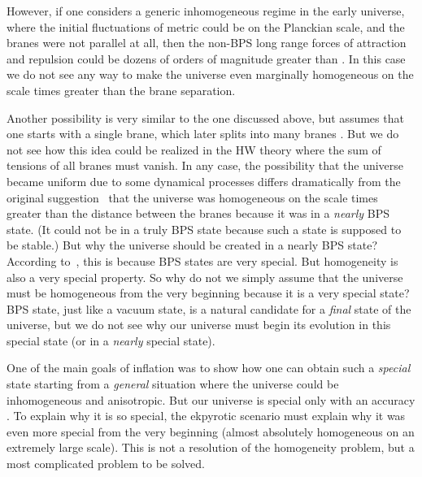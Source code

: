 \documentclass[a4paper,12pt]{article}
\begin{document}
However,  if one considers a generic inhomogeneous regime in the early
universe, where the initial fluctuations of metric could be \coordHE{} on the
Planckian scale, and the branes were not parallel at all, then  the
non-BPS long range forces of attraction and repulsion could be dozens of
orders of magnitude greater than  \coordHE{}. In this case we do
not see any way to make the universe even marginally homogeneous on the
scale \coordHE{} times greater than the brane separation.

Another possibility is very similar to the one discussed above, but assumes that one starts with a single brane, which later splits into many branes \cite{Khoury:2001iy}. But we do not see how this idea could be realized in the HW theory where the sum of tensions of all branes must vanish. In any case, the possibility that the universe became uniform due to some dynamical processes differs dramatically from the original suggestion~\cite{KOST}  that the universe was homogeneous on the scale \coordHE{} times greater than the distance between the branes because it was  in a  {\it nearly}  BPS state. (It could not be in a truly BPS state because such a state is supposed to be stable.) But why the universe should be created in a  nearly  BPS state? According to~\cite{KOST}, this is because BPS states are very special. But homogeneity is also a very special property. So why do not we simply assume that the universe must be homogeneous from the very beginning because it is a very special state? BPS state, just like a vacuum state, is a natural candidate for a {\it final} state of the universe, but we do not see why our universe must begin its evolution in this special state (or in a {\it nearly} special state).

One of the main goals of inflation was to show how one can obtain such a {\it special} state starting from a {\it general} situation where the universe could be inhomogeneous and anisotropic. But our universe is special only with an accuracy \coordHE{}. To explain why it is so special, the ekpyrotic scenario must explain why it was even more special  from the very beginning (almost absolutely homogeneous on an extremely large scale). This is not a resolution of the homogeneity problem, but a most complicated problem to be solved. 
\end{document}
